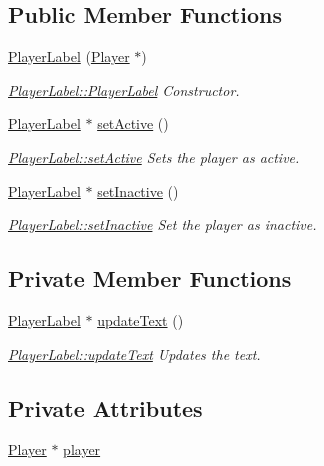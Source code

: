 \subsection*{Public Member Functions}
\begin{DoxyCompactItemize}
\item 
\hyperlink{class_player_label_a01014b0be21549ebd1fcec81fa8d6d58}{Player\-Label} (\hyperlink{class_player}{Player} $\ast$)
\begin{DoxyCompactList}\small\item\em \hyperlink{class_player_label_a01014b0be21549ebd1fcec81fa8d6d58}{Player\-Label\-::\-Player\-Label} Constructor. \end{DoxyCompactList}\item 
\hyperlink{class_player_label}{Player\-Label} $\ast$ \hyperlink{class_player_label_a2dfa25456fac3bd2f0a7bbaa4fac6678}{set\-Active} ()
\begin{DoxyCompactList}\small\item\em \hyperlink{class_player_label_a2dfa25456fac3bd2f0a7bbaa4fac6678}{Player\-Label\-::set\-Active} Sets the player as active. \end{DoxyCompactList}\item 
\hyperlink{class_player_label}{Player\-Label} $\ast$ \hyperlink{class_player_label_aecd91b6a5f19cd8228869a23bdb7da02}{set\-Inactive} ()
\begin{DoxyCompactList}\small\item\em \hyperlink{class_player_label_aecd91b6a5f19cd8228869a23bdb7da02}{Player\-Label\-::set\-Inactive} Set the player as inactive. \end{DoxyCompactList}\end{DoxyCompactItemize}
\subsection*{Private Member Functions}
\begin{DoxyCompactItemize}
\item 
\hyperlink{class_player_label}{Player\-Label} $\ast$ \hyperlink{class_player_label_a32738e0f6917a3942dd12569bb32ddd3}{update\-Text} ()
\begin{DoxyCompactList}\small\item\em \hyperlink{class_player_label_a32738e0f6917a3942dd12569bb32ddd3}{Player\-Label\-::update\-Text} Updates the text. \end{DoxyCompactList}\end{DoxyCompactItemize}
\subsection*{Private Attributes}
\begin{DoxyCompactItemize}
\item 
\hyperlink{class_player}{Player} $\ast$ \hyperlink{class_player_label_a3d7bf640f27b4539cb6886e53900b5b2}{player}
\end{DoxyCompactItemize}


